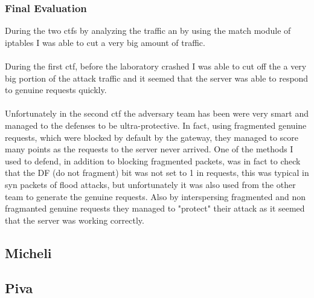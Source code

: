 \documentclass[14pt]{article}
\begin{document}
\subsubsection{Final Evaluation}
During the two ctfs by analyzing the traffic an by using the match module of iptables I was able to cut a very big amount of traffic. 
\\
\\
During the first ctf, before the laboratory crashed I was able to cut off the a very big portion of the attack traffic and it seemed that the server was able to respond to genuine requests quickly.
\\
\\
Unfortunately in the second ctf the adversary team has been were very smart and managed to the defenses to be ultra-protective. In fact, using fragmented genuine requests, which were blocked by default by the gateway, they managed to score many points as the requests to the server never arrived. One of the methods I used to defend, in addition to blocking fragmented packets, was in fact to check that the DF (do not fragment) bit was not set to 1 in requests, this was typical in syn packets of flood attacks, but unfortunately it was also used from the other team to generate the genuine requests. Also by interspersing fragmented and non fragmanted genuine requests they managed to "protect" their attack as it seemed that the server was working correctly.


\subsection{Micheli}

\subsection{Piva}
\end{document}
